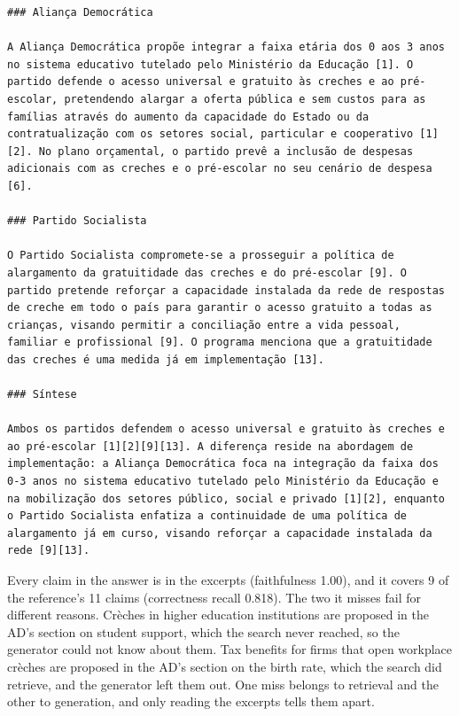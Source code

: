 \begin{Verbatim}[fontsize=\scriptsize, breaklines=true, frame=single]
### Aliança Democrática

A Aliança Democrática propõe integrar a faixa etária dos 0 aos 3 anos no sistema educativo tutelado pelo Ministério da Educação [1]. O partido defende o acesso universal e gratuito às creches e ao pré-escolar, pretendendo alargar a oferta pública e sem custos para as famílias através do aumento da capacidade do Estado ou da contratualização com os setores social, particular e cooperativo [1][2]. No plano orçamental, o partido prevê a inclusão de despesas adicionais com as creches e o pré-escolar no seu cenário de despesa [6].

### Partido Socialista

O Partido Socialista compromete-se a prosseguir a política de alargamento da gratuitidade das creches e do pré-escolar [9]. O partido pretende reforçar a capacidade instalada da rede de respostas de creche em todo o país para garantir o acesso gratuito a todas as crianças, visando permitir a conciliação entre a vida pessoal, familiar e profissional [9]. O programa menciona que a gratuitidade das creches é uma medida já em implementação [13].

### Síntese

Ambos os partidos defendem o acesso universal e gratuito às creches e ao pré-escolar [1][2][9][13]. A diferença reside na abordagem de implementação: a Aliança Democrática foca na integração da faixa dos 0-3 anos no sistema educativo tutelado pelo Ministério da Educação e na mobilização dos setores público, social e privado [1][2], enquanto o Partido Socialista enfatiza a continuidade de uma política de alargamento já em curso, visando reforçar a capacidade instalada da rede [9][13].
\end{Verbatim}

Every claim in the answer is in the excerpts (faithfulness 1.00), and it
covers 9 of the reference's 11 claims (correctness recall 0.818). The two it
misses fail for different reasons. Crèches in higher education institutions
are proposed in the AD's section on student support, which the search never
reached, so the generator could not know about them. Tax benefits for firms
that open workplace crèches are proposed in the AD's section on the birth
rate, which the search did retrieve, and the generator left them out. One miss
belongs to retrieval and the other to generation, and only reading the
excerpts tells them apart.

